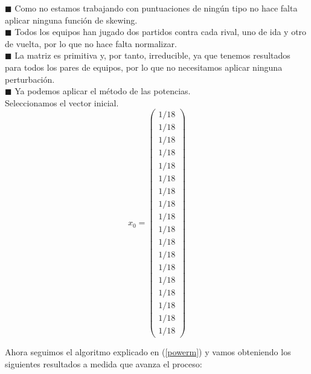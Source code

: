 	$\blacksquare $ Como no estamos trabajando con puntuaciones de ningún tipo no hace falta aplicar ninguna función de skewing.\\
	
	$\blacksquare $ Todos los equipos han jugado dos partidos contra cada rival, uno de ida y otro de vuelta, por lo que no hace falta normalizar.\\ 
	
	$\blacksquare $ La matriz es primitiva y, por tanto, irreducible, ya que tenemos resultados para todos los pares de equipos, por lo que no necesitamos aplicar ninguna perturbación.\\
	
	$\blacksquare $ Ya podemos aplicar el método de las potencias.\\
	
	
	Seleccionamos el vector inicial.
	\begin{equation*}
	x_{0} = 
	\left( \begin{array}{c}
	1/18\\
	1/18\\
	1/18\\
	1/18\\
	1/18\\
	1/18\\
	1/18\\
	1/18\\
	1/18\\
	1/18\\
	1/18\\
	1/18\\
	1/18\\
	1/18\\
	1/18\\
	1/18\\
	1/18\\
	1/18
	\end{array}\right) 
	\end{equation*}
	
	\newpage
	
	Ahora seguimos el algoritmo explicado en (\ref{powerm}) y vamos obteniendo los siguientes resultados a medida que avanza el proceso:
	
